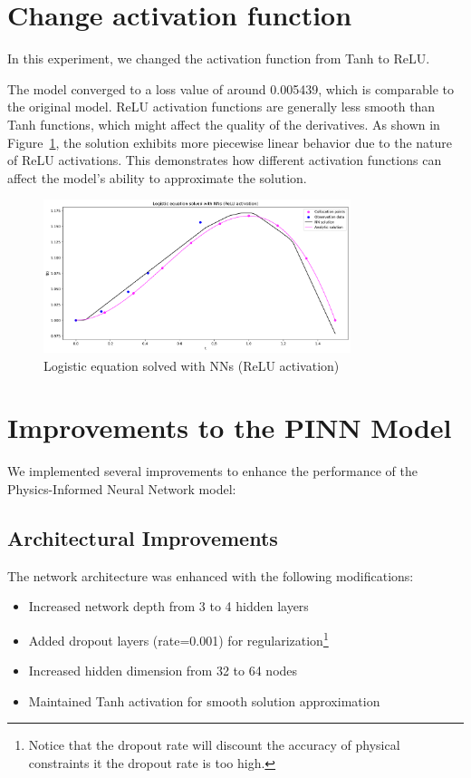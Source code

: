 \documentclass[11pt,a4paper]{article}
\begin{document}
\section{Change activation function}
In this experiment, we changed the activation function from Tanh to ReLU.

The model converged to a loss value of around 0.005439, which is comparable to the original model. ReLU activation functions are generally less smooth than Tanh functions, which might affect the quality of the derivatives. As shown in Figure~\ref{fig:relu}, the solution exhibits more piecewise linear behavior due to the nature of ReLU activations. This demonstrates how different activation functions can affect the model's ability to approximate the solution.

\begin{figure}[h]
    \centering
    \includegraphics[width=0.8\textwidth]{figures/pinn_task4_relu.png}
    \caption{Logistic equation solved with NNs (ReLU activation)}
    \label{fig:relu}
\end{figure}

\section{Improvements to the PINN Model}

We implemented several improvements to enhance the performance of the Physics-Informed Neural Network model:

\subsection{Architectural Improvements}
The network architecture was enhanced with the following modifications:
\begin{itemize}
    \item Increased network depth from 3 to 4 hidden layers
    \item Added dropout layers (rate=0.001) for regularization\footnote{Notice that the dropout rate will discount the accuracy of physical constraints it the dropout rate is too high.}
    \item Increased hidden dimension from 32 to 64 nodes
    \item Maintained Tanh activation for smooth solution approximation
\end{itemize}
\end{document}
